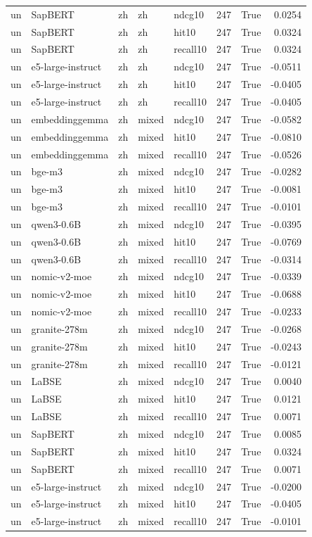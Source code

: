 \begin{tabular}{lllllrrr}
un & SapBERT & zh & zh & ndcg10 & 247 & True & 0.0254 \\
un & SapBERT & zh & zh & hit10 & 247 & True & 0.0324 \\
un & SapBERT & zh & zh & recall10 & 247 & True & 0.0324 \\
un & e5-large-instruct & zh & zh & ndcg10 & 247 & True & -0.0511 \\
un & e5-large-instruct & zh & zh & hit10 & 247 & True & -0.0405 \\
un & e5-large-instruct & zh & zh & recall10 & 247 & True & -0.0405 \\
un & embeddinggemma & zh & mixed & ndcg10 & 247 & True & -0.0582 \\
un & embeddinggemma & zh & mixed & hit10 & 247 & True & -0.0810 \\
un & embeddinggemma & zh & mixed & recall10 & 247 & True & -0.0526 \\
un & bge-m3 & zh & mixed & ndcg10 & 247 & True & -0.0282 \\
un & bge-m3 & zh & mixed & hit10 & 247 & True & -0.0081 \\
un & bge-m3 & zh & mixed & recall10 & 247 & True & -0.0101 \\
un & qwen3-0.6B & zh & mixed & ndcg10 & 247 & True & -0.0395 \\
un & qwen3-0.6B & zh & mixed & hit10 & 247 & True & -0.0769 \\
un & qwen3-0.6B & zh & mixed & recall10 & 247 & True & -0.0314 \\
un & nomic-v2-moe & zh & mixed & ndcg10 & 247 & True & -0.0339 \\
un & nomic-v2-moe & zh & mixed & hit10 & 247 & True & -0.0688 \\
un & nomic-v2-moe & zh & mixed & recall10 & 247 & True & -0.0233 \\
un & granite-278m & zh & mixed & ndcg10 & 247 & True & -0.0268 \\
un & granite-278m & zh & mixed & hit10 & 247 & True & -0.0243 \\
un & granite-278m & zh & mixed & recall10 & 247 & True & -0.0121 \\
un & LaBSE & zh & mixed & ndcg10 & 247 & True & 0.0040 \\
un & LaBSE & zh & mixed & hit10 & 247 & True & 0.0121 \\
un & LaBSE & zh & mixed & recall10 & 247 & True & 0.0071 \\
un & SapBERT & zh & mixed & ndcg10 & 247 & True & 0.0085 \\
un & SapBERT & zh & mixed & hit10 & 247 & True & 0.0324 \\
un & SapBERT & zh & mixed & recall10 & 247 & True & 0.0071 \\
un & e5-large-instruct & zh & mixed & ndcg10 & 247 & True & -0.0200 \\
un & e5-large-instruct & zh & mixed & hit10 & 247 & True & -0.0405 \\
un & e5-large-instruct & zh & mixed & recall10 & 247 & True & -0.0101 \\
\bottomrule
\end{tabular}
